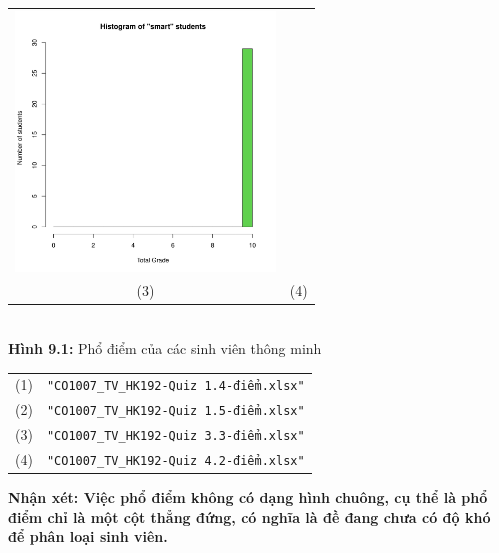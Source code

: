 \documentclass[a4paper]{article}
\theoremstyle{definition}
\begin{document}
\begin{enumerate}[a)]
\begin{itemize}
\begin{center}
\begin{tabular}{c c}
                 \includegraphics[width = 6.9cm]{Images/img9-1-4.png} \\
                 (3) & (4)
            \end{tabular}\\
            \textbf{Hình 9.1:} Phổ điểm của các sinh viên thông minh\\
            \begin{tabular}{c c}
                 (1) & \texttt{"CO1007\_TV\_HK192-Quiz 1.4-điểm.xlsx"}\\
                 (2) & \texttt{"CO1007\_TV\_HK192-Quiz 1.5-điểm.xlsx"}\\
                 (3) & \texttt{"CO1007\_TV\_HK192-Quiz 3.3-điểm.xlsx"}\\
                 (4) & \texttt{"CO1007\_TV\_HK192-Quiz 4.2-điểm.xlsx"}
            \end{tabular}
        \end{center}
    \end{itemize}
    \bf Nhận xét: \normalfont Việc phổ điểm không có dạng hình chuông, cụ thể là phổ điểm chỉ là một cột thẳng đứng, có nghĩa là đề đang chưa có độ khó để phân loại sinh viên.
\end{enumerate}

\end{document}
